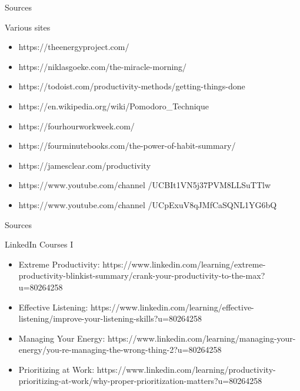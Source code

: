 \begin{frame}{Sources}
  \begin{block}{Various sites}
    \begin{itemize}
      \item https://theenergyproject.com/
      \item https://niklasgoeke.com/the-miracle-morning/
      \item https://todoist.com/productivity-methods/getting-things-done
      \item https://en.wikipedia.org/wiki/Pomodoro\_Technique
      \item https://fourhourworkweek.com/
      \item https://fourminutebooks.com/the-power-of-habit-summary/
      \item https://jamesclear.com/productivity
      \item https://www.youtube.com/channel
        /UCBIt1VN5j37PVM8LLSuTTlw
      \item https://www.youtube.com/channel
        /UCpExuV8qJMfCaSQNL1YG6bQ
    \end{itemize}
  \end{block}
\end{frame}

\begin{frame}{Sources}
  \begin{block}{LinkedIn Courses I}
    \begin{itemize}
      \item Extreme Productivity: https://www.linkedin.com/learning/extreme-productivity-blinkist-summary/crank-your-productivity-to-the-max?u=80264258
      \item Effective Listening: https://www.linkedin.com/learning/effective-listening/improve-your-listening-skills?u=80264258
      \item Managing Your Energy: https://www.linkedin.com/learning/managing-your-energy/you-re-managing-the-wrong-thing-2?u=80264258
      \item Prioritizing at Work: https://www.linkedin.com/learning/productivity-prioritizing-at-work/why-proper-prioritization-matters?u=80264258
    \end{itemize}
  \end{block}
\end{frame}

